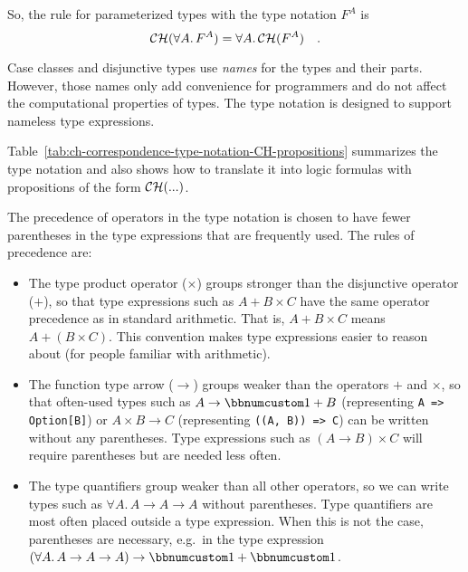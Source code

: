 So, the rule for parameterized types with the type notation $F^{A}$
is
\[
{\cal CH}(\forall A.\,F^{A})=\forall A.\,{\cal CH}(F^{A})\quad.
\]

Case classes and disjunctive types use \emph{names} for the types
and their parts. However, those names only add convenience for programmers
and do not affect the computational properties of types. The type
notation is designed to support nameless type expressions.

Table~\ref{tab:ch-correspondence-type-notation-CH-propositions}
summarizes the type notation and also shows how to translate it into
logic formulas with propositions of the form ${\cal CH}(...)$.

The precedence of operators
in the type notation is chosen to have fewer parentheses in the type
expressions that are frequently used. The rules of precedence are:
\begin{itemize}
\item The type product operator ($\times$) groups stronger than the disjunctive
operator ($+$), so that type expressions such as $A+B\times C$ have
the same operator precedence as in standard arithmetic. That is, $A+B\times C$
means $A+\left(B\times C\right)$. This convention makes type expressions
easier to reason about (for people familiar with arithmetic).
\item The function type arrow ($\rightarrow$) groups weaker than the operators
$+$ and $\times$, so that often-used types such as $A\rightarrow\bbnum 1+B$
(representing \lstinline!A => Option[B]!) or $A\times B\rightarrow C$
(representing \lstinline!((A, B)) => C!) can be written without any
parentheses. Type expressions such as $\left(A\rightarrow B\right)\times C$
will require parentheses but are needed less often.
\item The type quantifiers group weaker than all other operators, so we
can write types such as $\forall A.\,A\rightarrow A\rightarrow A$
without parentheses. Type quantifiers are most often placed outside
a type expression. When this is not the case, parentheses are necessary,
e.g.~in the type expression $\left(\forall A.\,A\rightarrow A\rightarrow A\right)\rightarrow\bbnum 1+\bbnum 1$.
\end{itemize}
